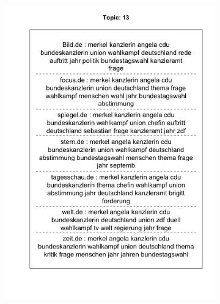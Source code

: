 \documentclass[12pt,a4paper,notitlepage]{article}
\begin{document}
\begin{figure}[H]
	\begin{center}
		\begin{subfigure}[normla]{0.49\textwidth}
			\includegraphics[width=\textwidth]{figs/plotquote13.png}
		\end{subfigure}
		\begin{subfigure}[normla]{0.49\textwidth}

\end{subfigure}
\end{center}
\end{figure}
\end{document}
